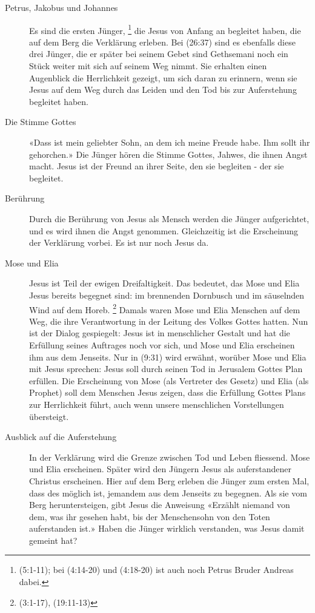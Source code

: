 \begin{impuls}
\begin{description}
\item[Petrus, Jakobus und Johannes]Es sind die ersten Jünger, 
\footnote{
(5:1-11); bei 
(4:14-20)
und
(4:18-20) ist auch noch Petrus Bruder Andreas dabei.
}
die Jesus von Anfang an begleitet haben, die auf dem Berg die Verklärung erleben. Bei 
(26:37) sind es ebenfalls diese drei Jünger, die er später bei seinem Gebet sind Gethsemani noch ein Stück weiter mit sich auf seinem Weg nimmt. Sie erhalten einen Augenblick die Herrlichkeit gezeigt, um sich daran zu erinnern, wenn sie Jesus auf dem Weg durch das Leiden und den Tod bis zur Auferstehung begleitet haben. 
\item[Die Stimme Gottes]«Dass ist mein geliebter Sohn, an dem ich meine Freude habe. Ihm sollt ihr gehorchen.» Die Jünger hören die Stimme Gottes, Jahwes, die ihnen Angst macht. Jesus ist der Freund an ihrer Seite, den sie begleiten - der sie begleitet.
\item[Berührung]Durch die Berührung von Jesus als Mensch werden die Jünger aufgerichtet, und es wird ihnen die Angst genommen. Gleichzeitig ist die Erscheinung der Verklärung vorbei. Es ist nur noch Jesus da.
\item[Mose und Elia] Jesus ist Teil der ewigen Dreifaltigkeit. Das bedeutet, das Mose und Elia Jesus bereits begegnet sind: im brennenden Dornbusch und im säuselnden Wind auf dem Horeb. 
\footnote{
(3:1-17),
(19:11-13)
}
Damals waren Mose und Elia Menschen auf dem Weg, die ihre Verantwortung in der Leitung des Volkes Gottes hatten. Nun ist der Dialog gespiegelt: Jesus ist in menschlicher Gestalt und hat die Erfüllung seines Auftrages noch vor sich, und Mose und Elia erscheinen ihm aus dem Jenseits. Nur in 
(9:31) wird erwähnt, worüber Mose und Elia mit Jesus sprechen: Jesus soll durch seinen Tod in Jerusalem Gottes Plan erfüllen. Die Erscheinung von Mose (als Vertreter des Gesetz) und Elia (als Prophet) soll dem Menschen Jesus zeigen, dass die Erfüllung Gottes Plans zur Herrlichkeit führt, auch wenn unsere menschlichen Vorstellungen übersteigt.
\item[Ausblick auf die Auferstehung]In der Verklärung wird die Grenze zwischen Tod und Leben fliessend. Mose und Elia erscheinen. Später wird den Jüngern Jesus als auferstandener Christus erscheinen. Hier auf dem Berg erleben die Jünger zum ersten Mal, dass des möglich ist, jemandem aus dem Jenseits zu begegnen. Als sie vom Berg heruntersteigen, gibt Jesus die Anweisung «Erzählt niemand von dem, was ihr gesehen habt, bis der Menschensohn von den Toten auferstanden ist.» Haben die Jünger wirklich verstanden, was Jesus damit gemeint hat?

\end{description}
\end{impuls}
